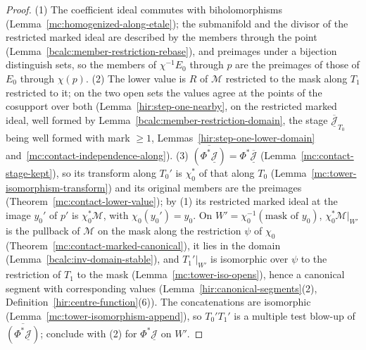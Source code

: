 \begin{proof}
\leanok
(1) The coefficient ideal commutes with biholomorphisms (Lemma~\ref{mc:homogenized-along-etale}); the submanifold and the divisor of the restricted marked ideal are
described by the members through the point (Lemma~\ref{bcalc:member-restriction-rebase}), and preimages under a bijection distinguish sets, so the members of
\(\chi^{-1}E_0\) through \(p\) are the preimages of those of \(E_0\) through \(\chi(p)\).
(2) The lower value is \(R\) of \(\mathcal M\) restricted to the mask along \(T_1\) restricted to it; on the two open sets the values agree at the points of the cosupport over
both (Lemma~\ref{hir:step-one-nearby}, on the restricted marked ideal, well formed by Lemma~\ref{bcalc:member-restriction-domain}, the stage
\(\overline{\underline{\mathcal J}}_{T_0}\) being well formed with mark \(\ge1\), Lemmas~\ref{hir:step-one-lower-domain} and~\ref{mc:contact-independence-along}).
(3) \(\overline{(\Phi^*\underline{\mathcal J})}=\Phi^*\overline{\underline{\mathcal J}}\) (Lemma~\ref{mc:contact-stage-kept}), so its transform along \(T_0'\) is \(\chi_0^*\) of that along \(T_0\)
(Lemma~\ref{mc:tower-isomorphism-transform}) and its original members are the preimages (Theorem~\ref{mc:contact-lower-value}); by (1) its restricted marked ideal at the
image \(y_0'\) of \(p'\) is \(\chi_0^*\mathcal M\), with \(\chi_0(y_0')=y_0\). On \(W'=\chi_0^{-1}(\text{mask of }y_0)\), \(\chi_0^*\mathcal M|_{W'}\) is the pullback of \(\mathcal M\) on
the mask along the restriction \(\psi\) of \(\chi_0\) (Theorem~\ref{mc:contact-marked-canonical}), it lies in the domain (Lemma~\ref{bcalc:inv-domain-stable}), and \(T_1'|_{W'}\) is
isomorphic over \(\psi\) to the restriction of \(T_1\) to the mask (Lemma~\ref{mc:tower-iso-opens}), hence a canonical segment with corresponding values
(Lemma~\ref{hir:canonical-segments}(2), Definition~\ref{hir:centre-function}(6)). The concatenations are isomorphic (Lemma~\ref{mc:tower-isomorphism-append}), so
\(T_0'T_1'\) is a multiple test blow-up of \(\overline{(\Phi^*\underline{\mathcal J})}\); conclude with (2) for \(\Phi^*\underline{\mathcal J}\) on \(W'\).
\end{proof}

